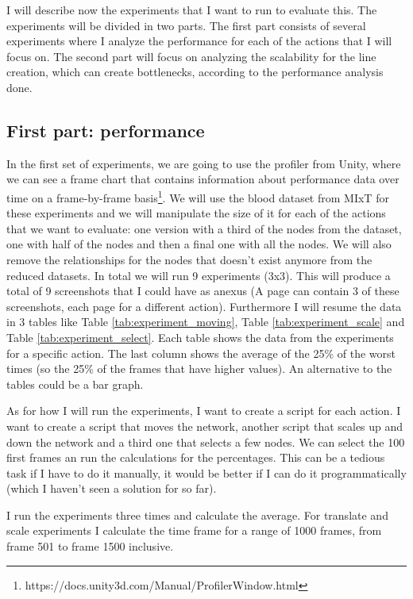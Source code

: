 I will describe now the experiments that I want to run to evaluate this. The experiments will be divided in two parts. The first part consists of several experiments where I analyze the performance for each of the actions that I will focus on. The second part will focus on analyzing the scalability for the line creation, which can create bottlenecks, according to the performance analysis done.

\subsection{First part: performance}

In the first set of experiments, we are going to use the profiler from Unity, where we can see a frame chart that contains information about performance data over time on a frame-by-frame basis\footnote{https://docs.unity3d.com/Manual/ProfilerWindow.html}. We will use the blood dataset from MIxT for these experiments and we will manipulate the size of it for each of the actions that we want to evaluate: one version with a third of the nodes from the dataset, one with half of the nodes and then a final one with all the nodes. We will also remove the relationships for the nodes that doesn't exist anymore from the reduced datasets. In total we will run 9 experiments (3x3). This will produce a total of 9 screenshots that I could have as anexus (A page can contain 3 of these screenshots, each page for a different action). Furthermore I will resume the data in 3 tables like Table \ref{tab:experiment_moving}, Table \ref{tab:experiment_scale} and Table \ref{tab:experiment_select}. Each table shows the data from the experiments for a specific action. The last column shows the average of the 25\% of the worst times (so the 25\% of the frames that have higher values). An alternative to the tables could be a bar graph.

As for how I will run the experiments, I want to create a script for each action. I want to create a script that moves the network, another script that scales up and down the network and a third one that selects a few nodes. We can select the 100 first frames an run the calculations for the percentages. This can be a tedious task if I have to do it manually, it would be better if I can do it programmatically (which I haven't seen a solution for so far).

I run the experiments three times and calculate the average. For translate and scale experiments I calculate the time frame for a range of 1000 frames, from frame 501 to frame 1500 inclusive.

